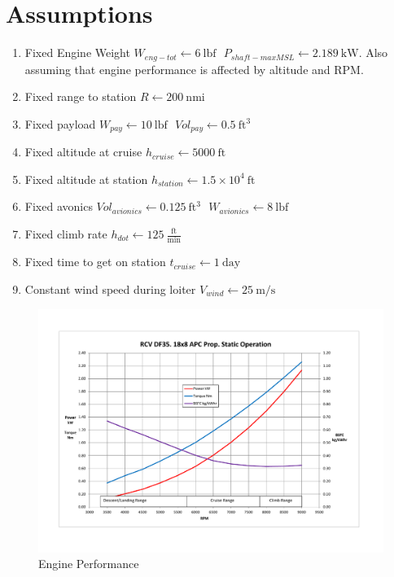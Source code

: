 \documentclass[10pt, a4paper]{article}
\begin{document}
\title{}
\author{Michael Burton}
\maketitle

\section*{Assumptions}

\begin{enumerate}
\item Fixed Engine Weight $ W_{eng-tot} \gets 6~\mathrm{lbf} \text{ } P_{shaft-maxMSL} \gets 2.189~\mathrm{kW} $.  Also assuming that engine performance is affected by altitude and RPM. 
\item Fixed range to station $ R \gets 200~\mathrm{nmi} $
\item Fixed payload $ W_{pay} \gets 10~\mathrm{lbf} \text{ } Vol_{pay} \gets 0.5~\mathrm{ft^{3}} $
\item Fixed altitude at cruise $ h_{cruise} \gets 5000~\mathrm{ft} $
\item Fixed altitude at station $ h_{station} \gets 1.5 \times 10^{4}~\mathrm{ft} $
\item Fixed avonics $ Vol_{avionics} \gets 0.125~\mathrm{ft^{3}} \text{ } W_{avionics} \gets 8~\mathrm{lbf} $
\item Fixed climb rate $ h_{dot} \gets 125~\mathrm{\tfrac{ft}{min}} $
\item Fixed time to get on station  $ t_{cruise} \gets 1~\mathrm{day} $
\item Constant wind speed during loiter $ V_{wind} \gets 25~\mathrm{m/s} $
\end{enumerate}


\begin{figure}[h!]
\begin{center}
\includegraphics[scale = .4]{engineperf}
\caption{Engine Performance}
\end{center}
\end{figure}
\end{document}
